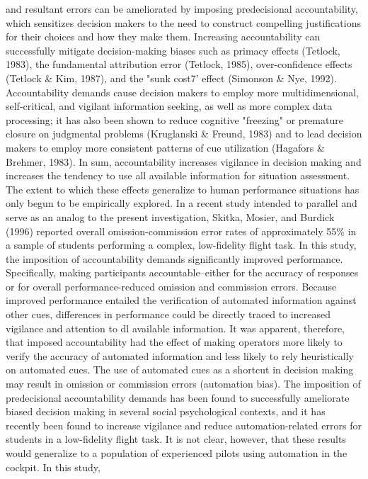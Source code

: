 \documentclass[utf8,bachelor,manualbib]{gradu3}
\begin{document}
and resultant errors can be ameliorated by imposing predecisional accountability,
which sensitizes decision makers to the need to construct compelling justifications
for their choices and how they make them. Increasing accountability can successfully
mitigate decision-making biases such as primacy effects (Tetlock, 1983), the
fundamental attribution error (Tetlock, 1985), over-confidence effects (Tetlock \&
Kim, 1987), and the "sunk cost7' effect (Simonson \& Nye, 1992). Accountability
demands cause decision makers to employ more multidimensional, self-critical,
and vigilant information seeking, as well as more complex data processing; it has
also been shown to reduce cognitive "freezing" or premature closure on judgmental
problems (Kruglanski \& Freund, 1983) and to lead decision makers to employ more
consistent patterns of cue utilization (Hagafors \& Brehmer, 1983). In sum, accountability
increases vigilance in decision making and increases the tendency to use all
available information for situation assessment.
The extent to which these effects generalize to human performance situations
has only begun to be empirically explored. In a recent study intended to parallel
and serve as an analog to the present investigation, Skitka, Mosier, and Burdick
(1996) reported overall omission-commission error rates of approximately 55\% in
a sample of students performing a complex, low-fidelity flight task. In this study, the imposition of accountability demands significantly improved performance.
Specifically, making participants accountable--either for the accuracy of responses
or for overall performance-reduced omission and commission errors. Because
improved performance entailed the verification of automated information against
other cues, differences in performance could be directly traced to increased vigilance
and attention to dl available information. It was apparent, therefore, that
imposed accountability had the effect of making operators more likely to verify the
accuracy of automated information and less likely to rely heuristically on automated
cues.
The use of automated cues as a shortcut in decision making may result in
omission or commission errors (automation bias). The imposition of predecisional
accountability demands has been found to successfully ameliorate biased decision
making in several social psychological contexts, and it has recently been found to
increase vigilance and reduce automation-related errors for students in a low-fidelity
flight task. It is not clear, however, that these results would generalize to a
population of experienced pilots using automation in the cockpit. In this study,
\end{document}
